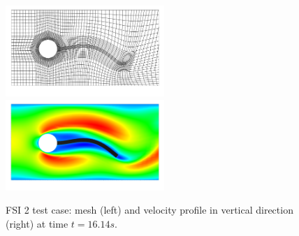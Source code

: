 \documentclass[prodmode,acmtoms]{acmsmall}
\numberwithin{equation}{section}
\begin{document}
\begin{figure}[h]
\centering
{\includegraphics[width=6cm]{Pictures/visit_fsi_2_CNn_t_2e-2_global_3_biharmonic_mesh8070_scale.png}}
{\includegraphics[width=6cm]{Pictures/visit_fsi_2_CNn_t_2e-2_global_3_biharmonic_x_velo8070_scale.png}}
\caption{FSI 2 test case: mesh (left) and velocity profile in vertical 
direction (right) at time $t=16.14s$.}
\label{res:fsi_2_mesh_and_x_velo}
\end{figure}
\end{document}
